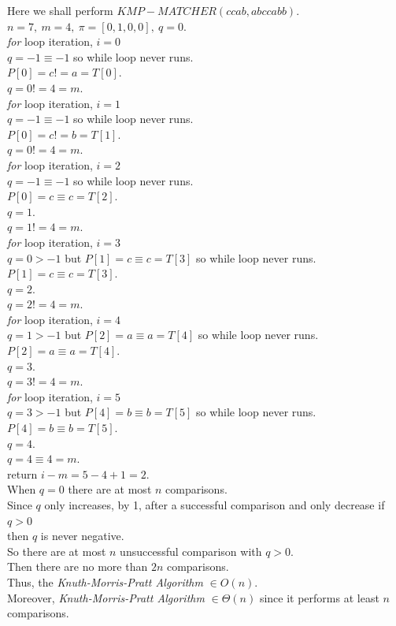 \documentclass[11pt,a4paper]{article}
\begin{document}
\newpage
{}
Here we shall perform $KMP-MATCHER(ccab, abccabb)$.\\
$n=7,\ m=4,\ \pi=[0,1,0,0],\ q=0$.\\
\textit{for} loop iteration, $i=0$\\
$q=-1\equiv-1$ so while loop never runs.\\
$P[0]=c!=a=T[0]$.\\
$q=0!=4=m$.\\
\textit{for} loop iteration, $i=1$\\
$q=-1\equiv-1$ so while loop never runs.\\
$P[0]=c!=b=T[1]$.\\
$q=0!=4=m$.\\
\textit{for} loop iteration, $i=2$\\
$q=-1\equiv-1$ so while loop never runs.\\
$P[0]=c\equiv c=T[2]$.\\
$q=1$.\\
$q=1!=4=m$.\\
\textit{for} loop iteration, $i=3$\\
$q=0>-1$ but $P[1]=c\equiv c=T[3]$ so while loop never runs.\\
$P[1]=c\equiv c=T[3]$.\\
$q=2$.\\
$q=2!=4=m$.\\
\textit{for} loop iteration, $i=4$\\
$q=1>-1$ but $P[2]=a\equiv a=T[4]$ so while loop never runs.\\
$P[2]=a\equiv a=T[4]$.\\
$q=3$.\\
$q=3!=4=m$.\\
\textit{for} loop iteration, $i=5$\\
$q=3>-1$ but $P[4]=b\equiv b=T[5]$ so while loop never runs.\\
$P[4]=b\equiv b=T[5]$.\\
$q=4$.\\
$q=4\equiv4=m$.\\
return $i-m=5-4+1=2$.\\

When $q=0$ there are at most $n$ comparisons.\\
Since $q$ only increases, by 1, after a successful comparison and only decrease if $q>0$\\
then $q$ is never negative.\\
So there are at most $n$ unsuccessful comparison with $q>0$.\\
Then there are no more than $2n$ comparisons.\\
Thus, the \textit{Knuth-Morris-Pratt Algorithm} $\in O(n)$.\\
Moreover, \textit{Knuth-Morris-Pratt Algorithm} $\in \Theta(n)$ since it performs at least $n$ comparisons.\\
\end{document}

